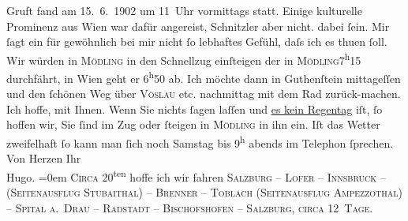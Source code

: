 \begin{ledgroupsized}[t]{13cm}
{{{                  Gruft fand am 15. 6. 1902 um 11 Uhr vormittags statt.
                  Einige kulturelle Prominenz aus Wien war dafür
                  angereist, Schnitzler aber nicht.}}}\label{K_L01222-2h}
               dabei ſein. Mir ſagt ein für gewöhnlich bei {\pb}mir nicht ſo lebhaftes Gefühl,
               daſs ich es thuen ſoll.\pend
           \pstart
           Wir würden in \textsc{Mödling} in den Schnellzug einſteigen der in \textsc{Mödling}7\textsuperscript{h}15 durchfährt, in Wien geht er 6\textsuperscript{h}50 ab.
               Ich möchte dann in Guthenſtein mittageſſen {\pb}und den ſchönen Weg über \textsc{Vöslau} etc. nachmittag mit dem Rad zurück-machen. Ich hoffe, mit Ihnen.\pend
           \pstart
           Wenn Sie nichts ſagen laſſen und \uline{es kein Regentag}
               iſt, ſo hoffen wir, Sie ſind im Zug oder ſteigen in \textsc{Mödling} in ihn ein.\pend
           \pstart
           {\pb}Iſt das Wetter zweifelhaft ſo
               kann man ſich noch Samstag bis 9\textsuperscript{h} abends im Telephon ſprechen.\pend
           \pstart
           Von Herzen Ihr{\\[\baselineskip]}\spacefill\mbox{Hugo.}\pend
           \leftskip=0em{}\pstart
           \noindent{}\textsc{Circa} 20\textsuperscript{ten} hoffe ich wir
                  fahren \textsc{Salzburg – Lofer – Innsbruck – (Seitenausflug
                        Stubaithal) – Brenner – Toblach
                     (Seitenausflug Ampezzothal) – Spital a. Drau – Radstadt – Bischofshofen – Salzburg, circa
                     12 Tage}.\pend
           
         
         \endnumbering{}\end{ledgroupsized}  \newcommand{\dateiname}{L01222}\newcommand{\titel}{Hugo von Hofmannsthal an Arthur Schnitzler, 1[1?]. 6. 1902}\newcommand{\editorInnen}{Martin Anton Müller und Gerd-Hermann Susen}
      